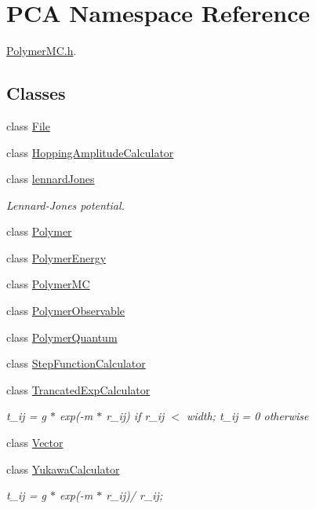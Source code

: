\hypertarget{namespace_p_c_a}{}\section{P\+CA Namespace Reference}
\label{namespace_p_c_a}


\hyperlink{_polymer_m_c_8h}{Polymer\+M\+C.\+h}.  


\subsection*{Classes}
\begin{DoxyCompactItemize}
\item 
class \hyperlink{class_p_c_a_1_1_file}{File}
\item 
class \hyperlink{class_p_c_a_1_1_hopping_amplitude_calculator}{Hopping\+Amplitude\+Calculator}
\item 
class \hyperlink{class_p_c_a_1_1lennard_jones}{lennard\+Jones}
\begin{DoxyCompactList}\small\item\em Lennard-\/\+Jones potential. \end{DoxyCompactList}\item 
class \hyperlink{class_p_c_a_1_1_polymer}{Polymer}
\item 
class \hyperlink{class_p_c_a_1_1_polymer_energy}{Polymer\+Energy}
\item 
class \hyperlink{class_p_c_a_1_1_polymer_m_c}{Polymer\+MC}
\item 
class \hyperlink{class_p_c_a_1_1_polymer_observable}{Polymer\+Observable}
\item 
class \hyperlink{class_p_c_a_1_1_polymer_quantum}{Polymer\+Quantum}
\item 
class \hyperlink{class_p_c_a_1_1_step_function_calculator}{Step\+Function\+Calculator}
\item 
class \hyperlink{class_p_c_a_1_1_trancated_exp_calculator}{Trancated\+Exp\+Calculator}
\begin{DoxyCompactList}\small\item\em t\+\_\+ij = g $\ast$ exp(-\/m $\ast$ r\+\_\+ij) if r\+\_\+ij $<$ width; t\+\_\+ij = 0 otherwise \end{DoxyCompactList}\item 
class \hyperlink{class_p_c_a_1_1_vector}{Vector}
\item 
class \hyperlink{class_p_c_a_1_1_yukawa_calculator}{Yukawa\+Calculator}
\begin{DoxyCompactList}\small\item\em t\+\_\+ij = g $\ast$ exp(-\/m $\ast$ r\+\_\+ij)/ r\+\_\+ij; \end{DoxyCompactList}\end{DoxyCompactItemize}
